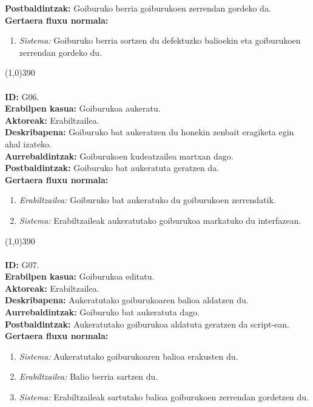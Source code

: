 \textbf{Postbaldintzak:} Goiburuko berria goiburukoen zerrendan gordeko da.\\
\textbf{Gertaera fluxu normala:}
\begin{enumerate}
	\item \textit{Sistema:} Goiburuko berria sortzen du defektuzko balioekin eta goiburukoen zerrendan gordeko du.
\end{enumerate}
\line(1,0){390}\\
\noindent\\
\textbf{ID:} G06.\\
\textbf{Erabilpen kasua:} Goiburukoa aukeratu.\\
\textbf{Aktoreak:} Erabiltzailea.\\
\textbf{Deskribapena:} Goiburuko bat aukeratzen du honekin zenbait eragiketa egin ahal izateko.\\
\textbf{Aurrebaldintzak:} Goiburukoen kudeatzailea martxan dago.\\
\textbf{Postbaldintzak:} Goiburuko bat aukeratuta geratzen da.\\
\textbf{Gertaera fluxu normala:}
\begin{enumerate}
	\item \textit{Erabiltzailea:} Goiburuko bat aukeratuko du goiburukoen zerrendatik.
	\item \textit{Sistema:} Erabiltzaileak aukeratutako goiburukoa markatuko du interfazean.
\end{enumerate}
\line(1,0){390}\\
\noindent\\
\textbf{ID:} G07.\\
\textbf{Erabilpen kasua:} Goiburukoa editatu.\\
\textbf{Aktoreak:} Erabiltzailea.\\
\textbf{Deskribapena:} Aukeratutako goiburukoaren balioa aldatzen du.\\
\textbf{Aurrebaldintzak:} Goiburuko bat aukeratuta dago.\\
\textbf{Postbaldintzak:} Aukeratutako goiburukoa aldatuta geratzen da script-ean.\\
\textbf{Gertaera fluxu normala:}
\begin{enumerate}
	\item \textit{Sistema:} Aukeratutako goiburukoaren balioa erakusten du.
	\item \textit{Erabiltzailea:} Balio berria sartzen du.
	\item \textit{Sistema:} Erabiltzaileak sartutako balioa goiburukoen zerrendan gordetzen du.
\end{enumerate}
